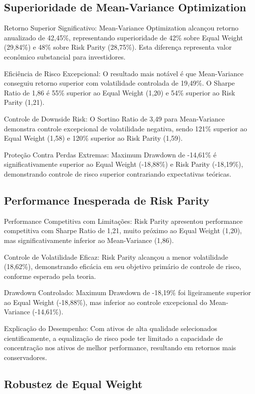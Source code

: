 \subsection{Superioridade de Mean-Variance Optimization}

Retorno Superior Significativo: Mean-Variance Optimization alcançou retorno anualizado de 42,45\%, representando superioridade de 42\% sobre Equal Weight (29,84\%) e 48\% sobre Risk Parity (28,75\%). Esta diferença representa valor econômico substancial para investidores.

Eficiência de Risco Excepcional: O resultado mais notável é que Mean-Variance conseguiu retorno superior com volatilidade controlada de 19,49\%. O Sharpe Ratio de 1,86 é 55\% superior ao Equal Weight (1,20) e 54\% superior ao Risk Parity (1,21).

Controle de Downside Risk: O Sortino Ratio de 3,49 para Mean-Variance demonstra controle excepcional de volatilidade negativa, sendo 121\% superior ao Equal Weight (1,58) e 120\% superior ao Risk Parity (1,59).

Proteção Contra Perdas Extremas: Maximum Drawdown de -14,61\% é significativamente superior ao Equal Weight (-18,88\%) e Risk Parity (-18,19\%), demonstrando controle de risco superior contrariando expectativas teóricas.

\subsection{Performance Inesperada de Risk Parity}

Performance Competitiva com Limitações: Risk Parity apresentou performance competitiva com Sharpe Ratio de 1,21, muito próximo ao Equal Weight (1,20), mas significativamente inferior ao Mean-Variance (1,86).

Controle de Volatilidade Eficaz: Risk Parity alcançou a menor volatilidade (18,62\%), demonstrando eficácia em seu objetivo primário de controle de risco, conforme esperado pela teoria.

Drawdown Controlado: Maximum Drawdown de -18,19\% foi ligeiramente superior ao Equal Weight (-18,88\%), mas inferior ao controle excepcional do Mean-Variance (-14,61\%).

Explicação do Desempenho: Com ativos de alta qualidade selecionados cientificamente, a equalização de risco pode ter limitado a capacidade de concentração nos ativos de melhor performance, resultando em retornos mais conservadores.

\subsection{Robustez de Equal Weight}

